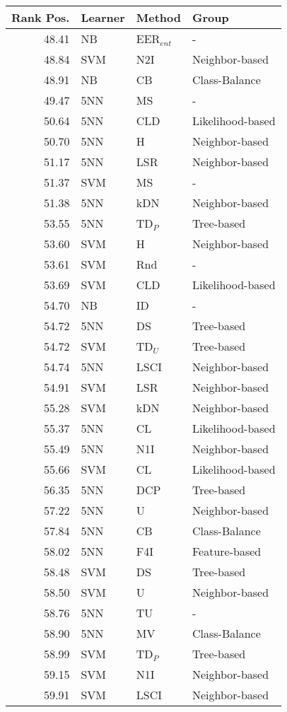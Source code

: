 \begin{tabular}{rlll}
\toprule
Rank Pos. & Learner & Method & Group \\
\midrule
48.41 & NB & EER$_{ent}$ & - \\
48.84 & SVM & N2I & Neighbor-based \\
48.91 & NB & CB & Class-Balance \\
49.47 & 5NN & MS & - \\
50.64 & 5NN & CLD & Likelihood-based \\
50.70 & 5NN & H & Neighbor-based \\
51.17 & 5NN & LSR & Neighbor-based \\
51.37 & SVM & MS & - \\
51.38 & 5NN & kDN & Neighbor-based \\
53.55 & 5NN & TD$_P$ & Tree-based \\
53.60 & SVM & H & Neighbor-based \\
53.61 & SVM & Rnd & - \\
53.69 & SVM & CLD & Likelihood-based \\
54.70 & NB & ID & - \\
54.72 & 5NN & DS & Tree-based \\
54.72 & SVM & TD$_U$ & Tree-based \\
54.74 & 5NN & LSCI & Neighbor-based \\
54.91 & SVM & LSR & Neighbor-based \\
55.28 & SVM & kDN & Neighbor-based \\
55.37 & 5NN & CL & Likelihood-based \\
55.49 & 5NN & N1I & Neighbor-based \\
55.66 & SVM & CL & Likelihood-based \\
56.35 & 5NN & DCP & Tree-based \\
57.22 & 5NN & U & Neighbor-based \\
57.84 & 5NN & CB & Class-Balance \\
58.02 & 5NN & F4I & Feature-based \\
58.48 & SVM & DS & Tree-based \\
58.50 & SVM & U & Neighbor-based \\
58.76 & 5NN & TU & - \\
58.90 & 5NN & MV & Class-Balance \\
58.99 & SVM & TD$_P$ & Tree-based \\
59.15 & SVM & N1I & Neighbor-based \\
59.91 & SVM & LSCI & Neighbor-based \\

\end{tabular}
